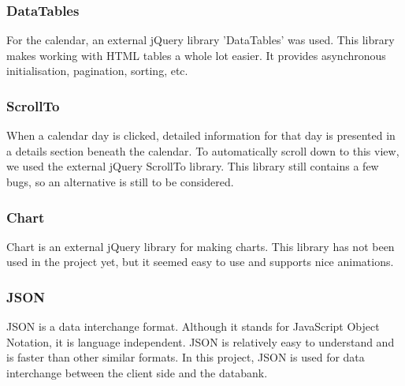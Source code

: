 \subsubsection{DataTables} 
For the calendar, an external jQuery library 'DataTables' was used. This library makes
working with HTML tables a whole lot easier. It provides asynchronous initialisation,
pagination, sorting, etc.

\subsubsection{ScrollTo}
When a calendar day is clicked, detailed information for that day is presented in a
details section beneath the calendar. To automatically scroll down to this view, we
used the external jQuery ScrollTo library. This library still contains a few bugs, so an
alternative is still to be considered.

\subsubsection{Chart}
Chart is an external jQuery library for making charts. This library has not been used in the project yet,
but it seemed easy to use and supports nice animations.

\subsubsection{JSON}
JSON is a data interchange format. Although it stands for JavaScript Object Notation, it
is language independent. JSON is relatively easy to understand and is faster than other
similar formats. In this project, JSON is used for data interchange between the client
side and the databank. 
